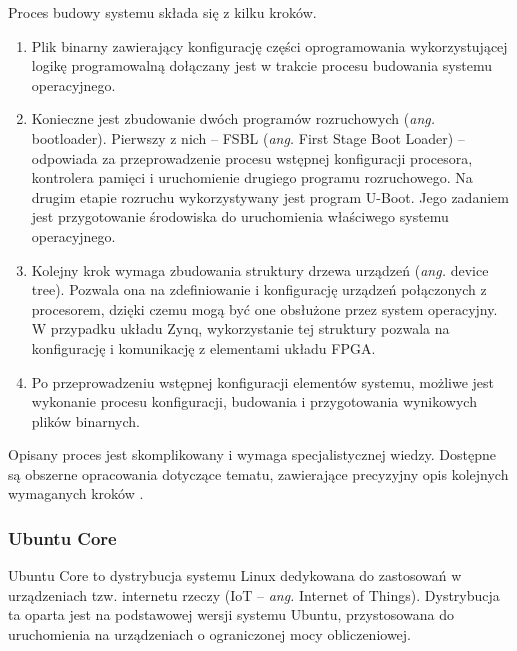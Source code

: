 Proces budowy systemu składa się z kilku kroków. 
\begin{enumerate}
\item Plik binarny zawierający konfigurację części oprogramowania wykorzystującej logikę programowalną dołączany jest w trakcie procesu budowania systemu operacyjnego.

\item Konieczne jest zbudowanie dwóch programów rozruchowych (\emph{ang.} bootloader).
Pierwszy z nich -- FSBL (\emph{ang.} First Stage Boot Loader) -- odpowiada za przeprowadzenie procesu wstępnej konfiguracji procesora, kontrolera pamięci i uruchomienie drugiego programu rozruchowego. 
Na drugim etapie rozruchu wykorzystywany jest program U-Boot. 
Jego zadaniem jest przygotowanie środowiska do uruchomienia właściwego systemu operacyjnego.

\item Kolejny krok wymaga zbudowania struktury drzewa urządzeń (\emph{ang.} device tree). 
Pozwala ona na zdefiniowanie i konfigurację urządzeń połączonych z procesorem, dzięki czemu mogą być one obsłużone przez system operacyjny. 
W przypadku układu Zynq, wykorzystanie tej struktury pozwala na konfigurację i komunikację z elementami układu FPGA.

\item Po przeprowadzeniu wstępnej konfiguracji elementów systemu, możliwe jest wykonanie procesu konfiguracji, budowania i przygotowania wynikowych plików binarnych.
\end{enumerate}
Opisany proces jest skomplikowany i wymaga specjalistycznej wiedzy. 
Dostępne są obszerne opracowania dotyczące tematu, zawierające precyzyjny opis kolejnych wymaganych kroków \cite{zybo-zynq-getting-started,zybo-stock-linux,xilinx-build-kernel}.


\subsubsection{Ubuntu Core}

Ubuntu Core to dystrybucja systemu Linux dedykowana do zastosowań w urządzeniach tzw. internetu rzeczy (IoT -- \emph{ang.} Internet of Things). 
Dystrybucja ta oparta jest na podstawowej wersji systemu Ubuntu, przystosowana do uruchomienia na urządzeniach o ograniczonej mocy obliczeniowej.

